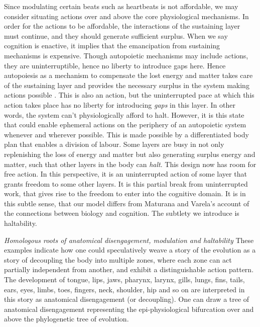 {{{{{ Since modulating certain beats such as heartbeats is not affordable, we may consider situating actions over and above the core physiological mechanisms. In order for the actions to be affordable, the interactions of the sustaining layer  must continue, and they should generate sufficient surplus. When we say cognition is enactive, it implies that the emancipation from sustaining mechanisms is expensive. Though autopoietic mechanisms may include actions, they are uninterruptible, hence no liberty to introduce gaps here. Hence autopoiesis as a mechanism to compensate the lost energy and matter takes care of the sustaining layer and provides the necessary surplus in the system making actions possible \cite{maturana1991autopoiesis}. This is also an action, but the uninterrupted pace at which this action takes place has no liberty for introducing \textit{gaps} in this layer. In other words, the system can't physiologically afford to halt. However, it is this state that could enable ephemeral actions on the periphery of an autopoietic system whenever and wherever possible. This is made possible by a differentiated body plan that enables a division of labour. Some layers are busy in not only replenishing the loss of energy and matter but also generating surplus energy and matter, such that other layers in the body can \textit{halt}. This design now has room for free action. In this perspective, it is an uninterrupted action of some layer that grants freedom to some other layers. It is this partial break from uninterrupted work, that gives rise to the freedom to enter into the cognitive domain. It is in this subtle sense, that our model differs from Maturana and Varela's account of the connections between biology and cognition. The subtlety we introduce is haltability. 

\emph{Homologous roots of anatomical disengagement, modulation and haltability} These examples indicate how one could speculatively weave a story of the evolution as a story of decoupling the body into multiple zones, where each zone can act partially independent from another, and exhibit a distinguishable action pattern. The development of tongue, lips, jaws, pharynx, larynx, gills, lungs, fins, tails, ears, eyes, limbs, toes, fingers, neck, shoulder, hip and so on are interpreted in this story as anatomical disengagement (or decoupling). One can draw a tree of anatomical disengagement representing the epi-physiological bifurcation over and above the phylogenetic tree of evolution. 

}}}}}
